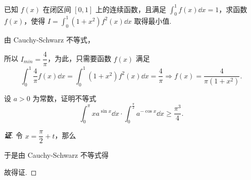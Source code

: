\begin{example}
    已知 $f(x)$ 在闭区间 $[0,1]$ 上的连续函数，且满足 $\displaystyle\int_{0}^{1} f(x)\dd x=1$，求函数 $f(x)$，使得 $\displaystyle I=\int_{0}^{1}(1+x^2)f^2(x)\dd x$ 取得最小值.
\end{example}
\begin{solution}
    由 Cauchy-Schwarz 不等式，
    所以 $I_{min}=\dfrac{4}{\pi}$，为此，只需要函数 $f(x)$ 满足 $$\displaystyle\int_{0}^{1}\dfrac{4}{\pi}f(x)\dd x=\int_{0}^{1}(1+x^2)f^2(x)\dd x=\dfrac{4}{\pi}\Rightarrow f(x)=\dfrac{4}{\pi(1+x^2)}.$$
\end{solution}

\begin{example}
    设 $a>0$ 为常数，证明不等式 $$\int_{0}^{\pi}xa^{\sin x}\dd x\cdot\int_{0}^{\frac{\pi}{2}}a^{-\cos x}\dd x\geqslant\dfrac{\pi^3}{4}.$$
\end{example}
\begin{proof}[{\songti \textbf{证}}]
    令 $x=\dfrac{\pi}{2}+t$，那么
    于是由 Cauchy-Schwarz 不等式得
    故得证.
\end{proof}

